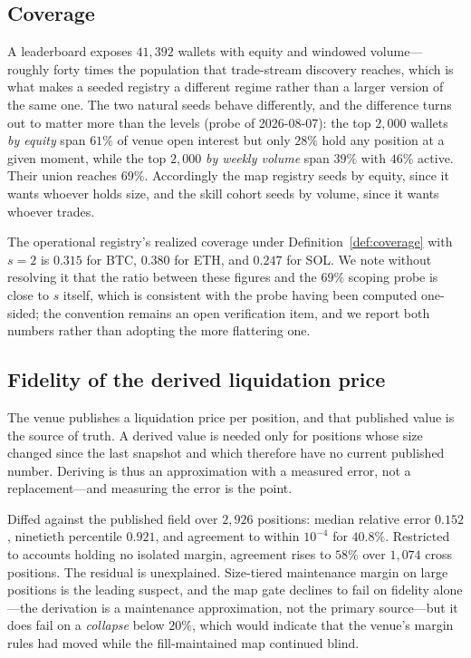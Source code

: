 \documentclass[11pt,a4paper]{article}
\theoremstyle{definition}
\theoremstyle{plain}
\begin{document}
\subsection{Coverage}

A leaderboard exposes $41{,}392$ wallets with equity and windowed volume---roughly forty times the
population that trade-stream discovery reaches, which is what makes a seeded registry a different
regime rather than a larger version of the same one. The two natural seeds behave differently, and
the difference turns out to matter more than the levels (probe of 2026-08-07): the top $2{,}000$
wallets \emph{by equity} span $61\%$ of venue open interest but only $28\%$ hold any position at a
given moment, while the top $2{,}000$ \emph{by weekly volume} span $39\%$ with $46\%$ active. Their
union reaches $69\%$. Accordingly the map registry seeds by equity, since it wants whoever holds
size, and the skill cohort seeds by volume, since it wants whoever trades.

The operational registry's realized coverage under Definition~\ref{def:coverage} with $s=2$ is $0.315$
for BTC, $0.380$ for ETH, and $0.247$ for SOL. We note without resolving it that the ratio between
these figures and the $69\%$ scoping probe is close to $s$ itself, which is consistent with the probe
having been computed one-sided; the convention remains an open verification item, and we report both
numbers rather than adopting the more flattering one.

\subsection{Fidelity of the derived liquidation price}

The venue publishes a liquidation price per position, and that published value is the source of
truth. A derived value is needed only for positions whose size changed since the last snapshot and
which therefore have no current published number. Deriving is thus an approximation with a measured
error, not a replacement---and measuring the error is the point.

Diffed against the published field over $2{,}926$ positions: median relative error $0.152$, ninetieth
percentile $0.921$, and agreement to within $10^{-4}$ for $40.8\%$. Restricted to accounts holding no
isolated margin, agreement rises to $58\%$ over $1{,}074$ cross positions. The residual is
unexplained. Size-tiered maintenance margin on large positions is the leading suspect, and the map
gate declines to fail on fidelity alone---the derivation is a maintenance approximation, not the
primary source---but it does fail on a \emph{collapse} below $20\%$, which would indicate that the
venue's margin rules had moved while the fill-maintained map continued blind.
\end{document}
